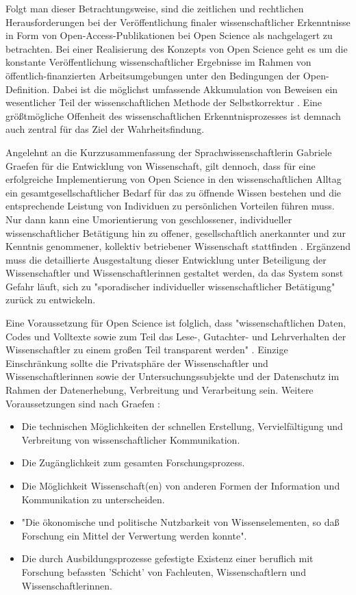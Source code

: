 Folgt man dieser Betrachtungsweise, sind die zeitlichen und rechtlichen Herausforderungen bei der Veröffentlichung finaler wissenschaftlicher Erkenntnisse in Form von Open-Access-Publikationen bei Open Science als nachgelagert zu betrachten. Bei einer Realisierung des Konzepts von Open Science geht es um die konstante Veröffentlichung wissenschaftlicher Ergebnisse im Rahmen von öffentlich-finanzierten Arbeitsumgebungen unter den Bedingungen der Open-Definition. Dabei ist die möglichst umfassende Akkumulation von Beweisen ein wesentlicher Teil der wissenschaftlichen Methode der Selbstkorrektur \cite{Nosek_2015}. Eine größtmögliche Offenheit des wissenschaftlichen Erkenntnisprozesses ist demnach auch zentral für das Ziel der Wahrheitsfindung.

Angelehnt an die Kurzzusammenfassung der Sprachwissenschaftlerin Gabriele Graefen für die Entwicklung von Wissenschaft, gilt dennoch, dass für eine erfolgreiche Implementierung von Open Science in den wissenschaftlichen Alltag ein gesamtgesellschaftlicher Bedarf für das zu öffnende Wissen bestehen und die entsprechende Leistung von Individuen zu persönlichen Vorteilen führen muss. Nur dann kann eine Umorientierung von geschlossener, individueller wissenschaftlicher Betätigung hin zu offener, gesellschaftlich anerkannter und zur Kenntnis genommener, kollektiv betriebener Wissenschaft stattfinden \cite{graefen2007_wissenschaftliche_artikel}. Ergänzend muss die detaillierte Ausgestaltung dieser Entwicklung unter Beteiligung der Wissenschaftler und Wissenschaftlerinnen gestaltet werden, da das System sonst Gefahr läuft, sich zu "sporadischer individueller wissenschaftlicher Betätigung" \cite{graefen2007_wissenschaftliche_artikel} zurück zu entwickeln.

Eine Voraussetzung für Open Science ist folglich, dass "wissenschaftlichen Daten, Codes und Volltexte sowie zum Teil das Lese-, Gutachter- und Lehrverhalten der Wissenschaftler zu einem großen Teil transparent werden" \cite{brembs2015open}. Einzige Einschränkung sollte die Privatsphäre der Wissenschaftler und Wissenschaftlerinnen sowie der Untersuchungssubjekte und der Datenschutz im Rahmen der Datenerhebung, Verbreitung und Verarbeitung sein. Weitere Voraussetzungen sind nach Graefen \cite{graefen2007_wissenschaftliche_artikel}:
\begin{itemize}
\item Die technischen Möglichkeiten der schnellen Erstellung, Vervielfältigung und Verbreitung von wissenschaftlicher Kommunikation.
\item Die Zugänglichkeit zum gesamten Forschungsprozess.
\item Die Möglichkeit Wissenschaft(en) von anderen Formen der Information und Kommunikation zu unterscheiden.
\item "Die ökonomische und politische Nutzbarkeit von Wissenselementen, so daß
Forschung ein Mittel der Verwertung werden konnte".
\item Die durch Ausbildungsprozesse gefestigte Existenz einer beruflich mit Forschung befassten 'Schicht' von Fachleuten, Wissenschaftlern und Wissenschaftlerinnen.
\end{itemize}

